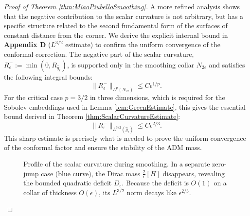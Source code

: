\begin{proof}[Proof of Theorem \ref{thm:MiaoPiubelloSmoothing}]
A more refined analysis shows that the negative contribution to the scalar curvature is not arbitrary, but has a specific structure related to the second fundamental form of the surfaces of constant distance from the corner. We derive the explicit internal bound in \textbf{Appendix D} ($L^{3/2}$ estimate) to confirm the uniform convergence of the conformal correction. The negative part of the scalar curvature, $R^-_\epsilon := \min(0, R_{\hat{g}_\epsilon})$, is supported only in the smoothing collar $N_{2\epsilon}$ and satisfies the following integral bounds:
\[ \|R^-_\epsilon\|_{L^p(N_{2\epsilon})} \le C \epsilon^{1/p}. \]
For the critical case $p=3/2$ in three dimensions, which is required for the Sobolev embeddings used in Lemma \ref{lem:GreenEstimate}, this gives the essential bound derived in Theorem \ref{thm:ScalarCurvatureEstimate}:
\begin{equation}
    \|R^-_\epsilon\|_{L^{3/2}(\hat{g}_\epsilon)} \le C \epsilon^{2/3}.
\end{equation}
This sharp estimate is precisely what is needed to prove the uniform convergence of the conformal factor and ensure the stability of the ADM mass.

\begin{figure}[htbp]
\centering
{}
\caption{Profile of the scalar curvature during smoothing. In a separate zero-jump case (blue curve), the Dirac mass $\frac{2}{\epsilon}[H]$ disappears, revealing the bounded quadratic deficit $D_\epsilon$. Because the deficit is $O(1)$ on a collar of thickness $O(\epsilon)$, its $L^{3/2}$ norm decays like $\epsilon^{2/3}$.}
\label{fig:SmoothingProfile}
\end{figure}


\end{proof}
